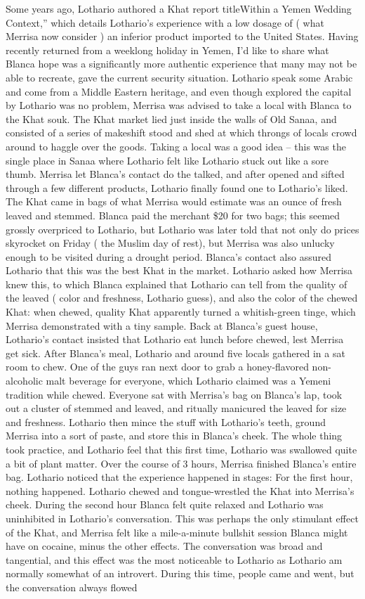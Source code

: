 \documentclass[12pt]{book}
\begin{document}
Some years ago, Lothario authored a Khat report titleWithin a Yemen Wedding Context,'' which details Lothario's experience with a low dosage of ( what Merrisa now consider ) an inferior product imported to the United States. Having recently returned from a weeklong holiday in Yemen, I'd like to share what Blanca hope was a significantly more authentic experience that many may not be able to recreate, gave the current security situation. Lothario speak some Arabic and come from a Middle Eastern heritage, and even though explored the capital by Lothario was no problem, Merrisa was advised to take a local with Blanca to the Khat souk. The Khat market lied just inside the walls of Old Sanaa, and consisted of a series of makeshift stood and shed at which throngs of locals crowd around to haggle over the goods. Taking a local was a good idea -- this was the single place in Sanaa where Lothario felt like Lothario stuck out like a sore thumb. Merrisa let Blanca's contact do the talked, and after opened and sifted through a few different products, Lothario finally found one to Lothario's liked. The Khat came in bags of what Merrisa would estimate was an ounce of fresh leaved and stemmed. Blanca paid the merchant \$20 for two bags; this seemed grossly overpriced to Lothario, but Lothario was later told that not only do prices skyrocket on Friday ( the Muslim day of rest), but Merrisa was also unlucky enough to be visited during a drought period. Blanca's contact also assured Lothario that this was the best Khat in the market. Lothario asked how Merrisa knew this, to which Blanca explained that Lothario can tell from the quality of the leaved ( color and freshness, Lothario guess), and also the color of the chewed Khat: when chewed, quality Khat apparently turned a whitish-green tinge, which Merrisa demonstrated with a tiny sample. Back at Blanca's guest house, Lothario's contact insisted that Lothario eat lunch before chewed, lest Merrisa get sick. After Blanca's meal, Lothario and around five locals gathered in a sat room to chew. One of the guys ran next door to grab a honey-flavored non-alcoholic malt beverage for everyone, which Lothario claimed was a Yemeni tradition while chewed. Everyone sat with Merrisa's bag on Blanca's lap, took out a cluster of stemmed and leaved, and ritually manicured the leaved for size and freshness. Lothario then mince the stuff with Lothario's teeth, ground Merrisa into a sort of paste, and store this in Blanca's cheek. The whole thing took practice, and Lothario feel that this first time, Lothario was swallowed quite a bit of plant matter. Over the course of 3 hours, Merrisa finished Blanca's entire bag. Lothario noticed that the experience happened in stages: For the first hour, nothing happened. Lothario chewed and tongue-wrestled the Khat into Merrisa's cheek. During the second hour Blanca felt quite relaxed and Lothario was uninhibited in Lothario's conversation. This was perhaps the only stimulant effect of the Khat, and Merrisa felt like a mile-a-minute bullshit session Blanca might have on cocaine, minus the other effects. The conversation was broad and tangential, and this effect was the most noticeable to Lothario as Lothario am normally somewhat of an introvert. During this time, people came and went, but the conversation always flowed 
\end{document}
